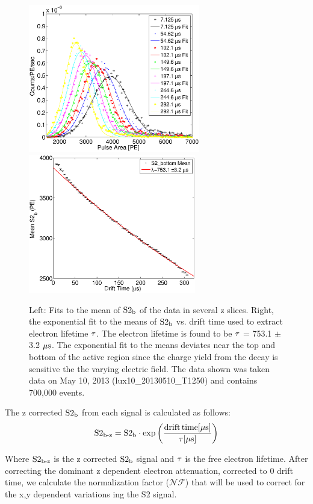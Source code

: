 \renewcommand{\baselinestretch}{1}
\small\normalsize
\begin{figure}[h!]\centering
\includegraphics[width=75mm]{Chapter_XYZ_Corr/Thesis_Corr_Plots/S2_bottom_hist_EL.eps}
\includegraphics[width=73mm]{Chapter_XYZ_Corr/Thesis_Corr_Plots/S2_bottom_lifetime.eps}
\caption{Left: Fits to the mean of $\rm S2_b$ of the \KrCal data in several z slices. Right, the exponential fit to the means of $\rm S2_b$ vs. drift time used to extract electron lifetime $\rm \tau$. The electron lifetime is found to be $\rm \tau$ = 753.1 $\pm$ 3.2 $\rm \mu s$. The exponential fit to the means deviates near the top and bottom of the active region since the charge yield from the \KrCal decay is sensitive the the varying electric field. The data shown was taken data on May 10, 2013 (lux10\_20130510\_T1250) and contains 700,000 \KrCal events. }
\label{fig:S2_EL}
\end{figure}
\renewcommand{\baselinestretch}{2}
\small\normalsize

The z corrected $\rm S2_b$ from each signal is calculated as follows:
\begin{equation}
\rm S2_{\operatorname{b-z}}=S2_b\cdot exp\left(\frac{drift\,time[\mu s]}{\tau[\mu s]}\right)
\label{eq:S2_Z}
\end{equation}

\noindent Where $\rm S2_{\operatorname{b-z}}$ is the z corrected $\rm S2_b$ signal and $\rm \tau$ is the free electron lifetime. After correcting the dominant z dependent electron attenuation, corrected to 0 drift time, we calculate the normalization factor ($\mathcal{NF}$) that will be used to correct for the x,y dependent variations ing the S2 signal.

